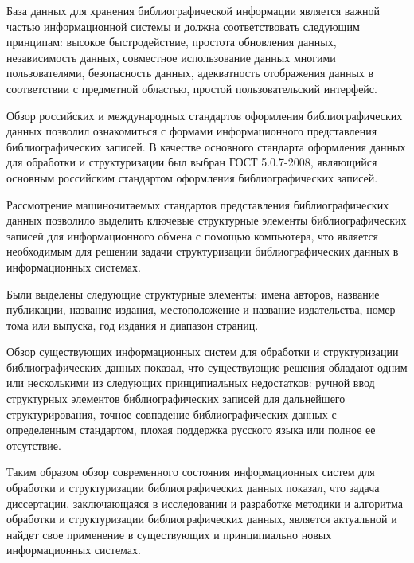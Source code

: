 База данных для хранения библиографической информации является важной частью информационной системы и должна соответствовать следующим принципам: высокое быстродействие, простота обновления данных, независимость данных, совместное использование данных многими пользователями, безопасность данных, адекватность отображения данных в соответствии с предметной областью, простой пользовательский интерфейс.

Обзор российских и международных стандартов оформления библиографических данных позволил ознакомиться с формами информационного представления библиографических записей. В качестве основного стандарта оформления данных для обработки и структуризации был выбран ГОСТ 5.0.7-2008, являющийся основным российским стандартом оформления библиографических записей.

Рассмотрение машиночитаемых стандартов представления библиографических данных позволило выделить ключевые структурные элементы библиографических записей для информационного обмена с помощью компьютера, что является необходимым для решении задачи структуризации библиографических данных в информационных системах.

Были выделены следующие структурные элементы: имена авторов, название публикации, название издания, местоположение и название издательства, номер тома или выпуска, год издания и диапазон страниц.

Обзор существующих информационных систем для обработки и структуризации библиографических данных показал, что существующие решения обладают одним или несколькими из следующих принципиальных недостатков: ручной ввод структурных элементов библиографических записей для дальнейшего структурирования, точное совпадение библиографических данных с определенным стандартом, плохая поддержка русского языка или полное ее отсутствие.

Таким образом обзор современного состояния информационных систем для обработки и структуризации библиографических данных показал, что задача диссертации, заключающаяся в исследовании и разработке методики и алгоритма обработки и структуризации библиографических данных, является актуальной и найдет свое применение в существующих и принципиально новых информационных системах.
